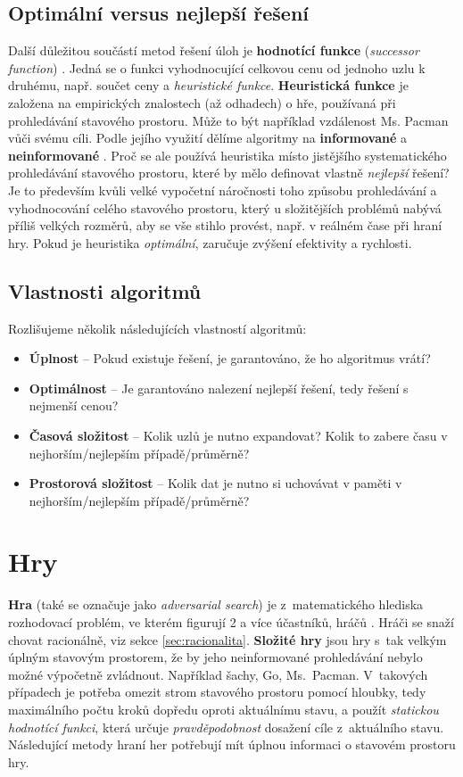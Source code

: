 \subsection*{Optimální versus nejlepší řešení}
Další důležitou součástí metod řešení úloh je \textbf{hodnotící funkce} (\textit{successor function}) \cite{AI1}. Jedná se o funkci vyhodnocující celkovou cenu od jednoho uzlu k druhému, např. součet ceny a \textit{heuristické funkce}.
\textbf{Heuristická funkce} \cite{berkeley} je založena na empirických znalostech (až odhadech) o hře, používaná při prohledávání stavového prostoru. Může to být například vzdálenost Ms. Pacman vůči svému cíli. Podle jejího využití dělíme algoritmy na \textbf{informované} a \textbf{neinformované} \cite{AI1}.
Proč se ale používá heuristika místo jistějšího systematického prohledávání stavového prostoru, které by mělo definovat vlastně \textit{nejlepší} řešení? Je to především kvůli velké vypočetní náročnosti toho způsobu prohledávání a vyhodnocování celého stavového prostoru, který u složitějších problémů nabývá příliš velkých rozměrů, aby se vše stihlo provést, např. v reálném čase při hraní hry. Pokud je heuristika \textit{optimální}, zaručuje zvýšení efektivity a rychlosti.
\newpage
\subsection*{Vlastnosti algoritmů}
Rozlišujeme několik následujících vlastností algoritmů\cite{AI1}:
\begin{itemize}
\item \textbf{Úplnost} – Pokud existuje řešení, je garantováno, že ho algoritmus vrátí?
\item \textbf{Optimálnost} – Je garantováno nalezení nejlepší řešení, tedy řešení s nejmenší cenou?
\item \textbf{Časová složitost} – Kolik uzlů je nutno expandovat? Kolik to zabere času v nejhorším/nejlepším případě/průměrně?
\item \textbf{Prostorová složitost} – Kolik dat je nutno si uchovávat v paměti v nejhorším/nejlepším případě/průměrně?
\end{itemize}

\section{Hry}
\textbf{Hra} (také se označuje jako \textit{adversarial search}) je z matematického hlediska rozhodovací problém, ve kterém figurují 2 a více účastníků, hráčů \cite{AI1}. Hráči se snaží chovat racionálně, viz sekce \ref{sec:racionalita}.
\newline
\textbf{Složité hry} \cite{AI1} jsou hry s tak velkým úplným stavovým prostorem, že by jeho neinformované prohledávání nebylo možné výpočetně zvládnout. Například šachy, Go, Ms. Pacman. V takových případech je potřeba omezit strom stavového prostoru pomocí hloubky, tedy maximálního počtu kroků dopředu oproti aktuálnímu stavu, a použít \textit{statickou hodnotící funkci}, která určuje \textit{pravděpodobnost} dosažení cíle z aktuálního stavu. Následující metody hraní her potřebují mít úplnou informaci o stavovém prostoru hry.
